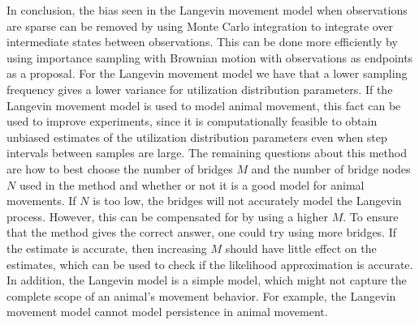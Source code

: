 

In conclusion, the bias seen in the Langevin movement model when observations are sparse can be removed by using Monte Carlo integration to integrate over intermediate states between observations. This can be done more efficiently by using importance sampling with Brownian motion with observations as endpoints as a proposal. For the Langevin movement model we have that a lower sampling frequency gives a lower variance for utilization distribution parameters. If the Langevin movement model is used to model animal movement, this fact can be used to improve experiments, since it is computationally feasible to obtain unbiased estimates of the utilization distribution parameters even when step intervals between samples are large. The remaining questions about this method are how to best choose the number of bridges $M$ and the number of bridge nodes $N$ used in the method and whether or not it is a good model for animal movements. If $N$ is too low, the bridges will not accurately model the Langevin process. However, this can be compensated for by using a higher $M$. To ensure that the method gives the correct answer, one could try using more bridges. If the estimate is accurate, then increasing $M$ should have little effect on the estimates, which can be used to check if the likelihood approximation is accurate. In addition,
the Langevin model is a simple model, which might not capture the complete scope of an animal's movement behavior. For example, the Langevin movement model cannot model persistence in animal movement. 




 